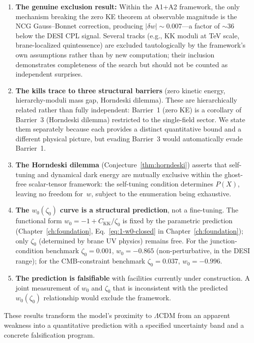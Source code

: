 \begin{enumerate}
  \item \textbf{The genuine exclusion result:} Within the A1+A2 framework, the only mechanism breaking the zero KE theorem at observable magnitude is the NCG Gauss--Bonnet correction, producing $|\delta w| \sim 0.007$---a factor of ${\sim}36$ below the DESI CPL signal. Several tracks (e.g., KK moduli at TeV scale, brane-localized quintessence) are excluded tautologically by the framework's own assumptions rather than by new computation; their inclusion demonstrates completeness of the search but should not be counted as independent surprises.

  \item \textbf{The kills trace to three structural barriers} (zero kinetic energy, hierarchy-moduli mass gap, Horndeski dilemma). These are hierarchically related rather than fully independent: Barrier~1 (zero KE) is a corollary of Barrier~3 (Horndeski dilemma) restricted to the single-field sector. We state them separately because each provides a distinct quantitative bound and a different physical picture, but evading Barrier~3 would automatically evade Barrier~1.

  \item \textbf{The Horndeski dilemma} (Conjecture~\ref{thm:horndeski}) asserts that self-tuning and dynamical dark energy are mutually exclusive within the ghost-free scalar-tensor framework: the self-tuning condition determines $P(X)$, leaving no freedom for~$w$, subject to the enumeration being exhaustive.

  \item \textbf{The $w_0(\zeta_0)$ curve is a structural prediction}, not a fine-tuning. The functional form $w_0 = -1 + C_\mathrm{KK}/\zeta_0$ is fixed by the parametric prediction (Chapter~\ref{ch:foundation}, Eq.~\eqref{eq:1-w0-closed} in Chapter~\ref{ch:foundation}); only $\zeta_0$ (determined by brane UV physics) remains free. For the junction-condition benchmark $\zeta_0 = 0.001$, $w_0 = -0.865$ (non-perturbative, in the DESI range); for the CMB-constraint benchmark $\zeta_0 = 0.037$, $w_0 = -0.996$.

  \item \textbf{The prediction is falsifiable} with facilities currently under construction. A joint measurement of $w_0$ and $\zeta_0$ that is inconsistent with the predicted $w_0(\zeta_0)$ relationship would exclude the framework.
\end{enumerate}

These results transform the model's proximity to $\Lambda$CDM from an apparent weakness into a quantitative prediction with a specified uncertainty band and a concrete falsification program.


